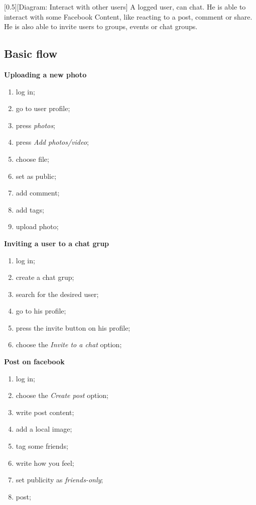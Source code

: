 \documentclass{article}
\begin{document}
			[0.5][Diagram: Interact with other users]
			A logged user, can chat. He is able to interact with some Facebook Content, like reacting to a post, comment or share. He is also able to invite users to groups, events or chat groups.

		\subsection{Basic flow}

			\textbf{Uploading a new photo}
			\begin{enumerate}
				\item log in;
				\item go to user profile;
				\item press \textit{photos};
				\item press \textit{Add photos/video};
				\item choose file;
				\item set as public;
				\item add comment;
				\item add tags;
				\item upload photo;
			\end{enumerate}

			\textbf{Inviting a user to a chat grup}
			\begin{enumerate}
				\item log in;
				\item create a chat grup;
				\item search for the desired user;
				\item go to his profile;
				\item press the invite button on his profile;
				\item choose the \textit{Invite to a chat} option;
			\end{enumerate}

			\textbf{Post on facebook}
			\begin{enumerate}
				\item log in;
				\item choose the \textit{Create post} option;
				\item write post content;
				\item add a local image;
				\item tag some friends;
				\item write how you feel;
				\item set publicity as \textit{friends-only};
				\item post;
			\end{enumerate}
\end{document}
